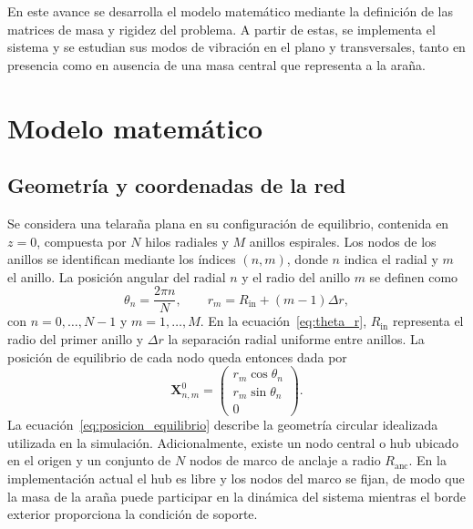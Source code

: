\documentclass[11pt,letterpaper]{article}
\begin{document}
En este avance se desarrolla el modelo matemático mediante la definición de las matrices de masa y rigidez del problema. A partir de estas, se implementa el sistema y se estudian sus modos de vibración en el plano y transversales, tanto en presencia como en ausencia de una masa central que representa a la araña.


\section{Modelo matemático}

\subsection{Geometría y coordenadas de la red}

Se considera una telaraña plana en su configuración de equilibrio, contenida en $z=0$, compuesta por $N$ hilos radiales y $M$ anillos espirales. Los nodos de los anillos se identifican mediante los índices $(n,m)$, donde $n$ indica el radial y $m$ el anillo. La posición angular del radial $n$ y el radio del anillo $m$ se definen como
\begin{equation}
\theta_n=\frac{2\pi n}{N}, \qquad
r_m=R_{\mathrm{in}}+(m-1)\Delta r,
\label{eq:theta_r}
\end{equation}
con $n=0,\ldots,N-1$ y $m=1,\ldots,M$. En la ecuación~\eqref{eq:theta_r}, $R_{\mathrm{in}}$ representa el radio del primer anillo y $\Delta r$ la separación radial uniforme entre anillos. La posición de equilibrio de cada nodo queda entonces dada por
\begin{equation}
\mathbf{X}^{0}_{n,m}=
\begin{pmatrix}
r_m\cos\theta_n\\
r_m\sin\theta_n\\
0
\end{pmatrix}.
\label{eq:posicion_equilibrio}
\end{equation}
La ecuación~\eqref{eq:posicion_equilibrio} describe la geometría circular idealizada utilizada en la simulación. Adicionalmente, existe un nodo central o hub ubicado en el origen y un conjunto de $N$ nodos de marco de anclaje a radio $R_{\mathrm{anc}}$. En la implementación actual el hub es libre y los nodos del marco se fijan, de modo que la masa de la araña puede participar en la dinámica del sistema mientras el borde exterior proporciona la condición de soporte.
\end{document}
